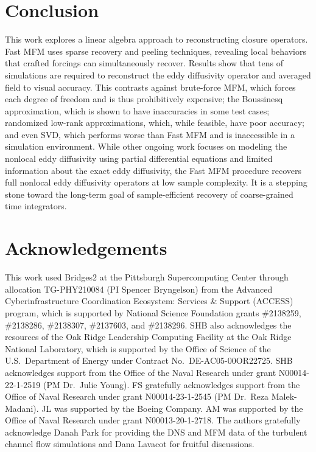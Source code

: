 \section{Conclusion}\label{s:conclusions}

This work explores a linear algebra approach to reconstructing closure operators.
Fast MFM uses sparse recovery and peeling techniques, revealing local behaviors that crafted forcings can simultaneously recover.
Results show that tens of simulations are required to reconstruct the eddy diffusivity operator and averaged field to visual accuracy.
This contrasts against brute-force MFM, which forces each degree of freedom and is thus prohibitively expensive; the Boussinesq approximation, which is shown to have inaccuracies in some test cases; randomized low-rank approximations, which, while feasible, have poor accuracy; and even SVD, which performs worse than Fast MFM and is inaccessible in a simulation environment.
While other ongoing work focuses on modeling the nonlocal eddy diffusivity using partial differential equations and limited information about the exact eddy diffusivity, the Fast MFM procedure recovers full nonlocal eddy diffusivity operators at low sample complexity. 
It is a stepping stone toward the long-term goal of sample-efficient recovery of coarse-grained time integrators.

\section*{Acknowledgements}

This work used Bridges2 at the Pittsburgh Supercomputing Center through allocation TG-PHY210084 (PI Spencer Bryngelson) from the Advanced Cyberinfrastructure Coordination Ecosystem: Services \& Support (ACCESS) program, which is supported by National Science Foundation grants \#2138259, \#2138286, \#2138307, \#2137603, and \#2138296.
SHB also acknowledges the resources of the Oak Ridge Leadership Computing Facility at the Oak Ridge National Laboratory, which is supported by the Office of Science of the U.S.\ Department of Energy under Contract No.\ DE-AC05-00OR22725. 
SHB acknowledges support from the Office of the Naval Research under grant N00014-22-1-2519 (PM Dr.\ Julie Young).
FS gratefully acknowledges support from the Office of Naval Research under grant N00014-23-1-2545 (PM Dr.\ Reza Malek-Madani).
JL was supported by the Boeing Company. 
AM was supported by the Office of Naval Research under grant N00013-20-1-2718. 
The authors gratefully acknowledge Danah Park for providing the DNS and MFM data of the turbulent channel flow simulations and Dana Lavacot for fruitful discussions.




